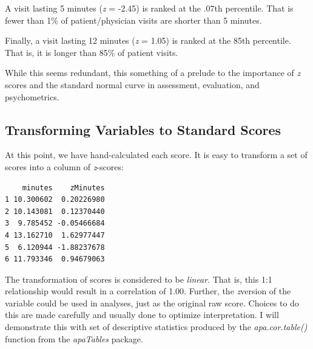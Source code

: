 \documentclass[
  11pt,
]{book}
\newenvironment{Shaded}{\begin{snugshade}}{\end{snugshade}}
\newcommand{\FunctionTok}[1]{\textcolor[rgb]{0.00,0.00,0.00}{#1}}
\newcommand{\NormalTok}[1]{#1}
\newcommand{\OtherTok}[1]{\textcolor[rgb]{0.56,0.35,0.01}{#1}}
\newcommand{\SpecialCharTok}[1]{\textcolor[rgb]{0.00,0.00,0.00}{#1}}
\begin{document}
A visit lasting 5 minutes (\emph{z} = -2.45) is ranked at the .07th percentile. That is fewer than 1\% of patient/physician visits are shorter than 5 minutes.

Finally, a visit lasting 12 minutes (\emph{z} = 1.05) is ranked at the 85th percentile. That is, it is longer than 85\% of patient visits.

While this seems redundant, this something of a prelude to the importance of \emph{z} scores and the standard normal curve in assessment, evaluation, and psychometrics.

\hypertarget{transforming-variables-to-standard-scores}{%
\subsection{Transforming Variables to Standard Scores}\label{transforming-variables-to-standard-scores}}

At this point, we have hand-calculated each score. It is easy to transform a set of scores into a column of \emph{z}-scores:

\begin{Shaded}
\end{Shaded}

\begin{verbatim}
    minutes    zMinutes
1 10.300602  0.20226980
2 10.143081  0.12370440
3  9.785452 -0.05466684
4 13.162710  1.62977447
5  6.120944 -1.88237678
6 11.793346  0.94679063
\end{verbatim}

The transformation of scores is considered to be \emph{linear}. That is, this 1:1 relationship would result in a correlation of 1.00. Further, the \emph{z}version of the variable could be used in analyses, just as the original raw score. Choices to do this are made carefully and usually done to optimize interpretation. I will demonstrate this with set of descriptive statistics produced by the \emph{apa.cor.table()} function from the \emph{apaTables} package.
\end{document}
